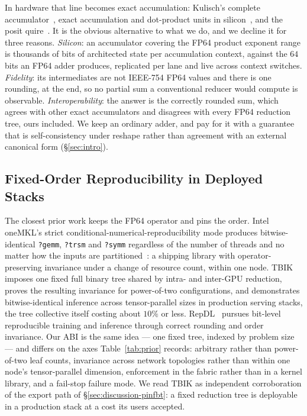 \documentclass[journal,10pt]{IEEEtran}
\theoremstyle{plain}
\theoremstyle{definition}
\theoremstyle{remark}
\newcommand{\sv}[1]{\texttt{#1}}
\begin{document}
In hardware that line becomes exact accumulation: Kulisch's complete
accumulator~\cite{kulisch2013arithmetic}, exact accumulation and dot-product
units in silicon~\cite{dedinechin2008accumulation,koenig2017exactdot}, and
the posit quire~\cite{gustafson2017posit}. It is the obvious alternative to
what we do, and we decline it for three reasons. \emph{Silicon}: an
accumulator covering the FP64 product exponent range is thousands of bits of
architected state per accumulation context, against the $64$ bits an FP64
adder produces, replicated per lane and live across context switches.
\emph{Fidelity}: its intermediates are not IEEE-754 FP64 values and there is
one rounding, at the end, so no partial sum a conventional reducer would
compute is observable. \emph{Interoperability}: the answer is the correctly
rounded sum, which agrees with other exact accumulators and disagrees with
every FP64 reduction tree, ours included. We keep an ordinary adder, and pay
for it with a guarantee that is self-consistency under reshape rather than
agreement with an external canonical form (\S\ref{sec:intro}).

\subsection{Fixed-Order Reproducibility in Deployed Stacks}

The closest prior work keeps the FP64 operator and pins the order. Intel
oneMKL's strict conditional-numerical-reproducibility mode produces
bitwise-identical \sv{?gemm}, \sv{?trsm} and \sv{?symm} regardless of the
number of threads and no matter how the inputs are
partitioned~\cite{onemkl_cnr}: a shipping library with operator-preserving
invariance under a change of resource count, within one node.
TBIK~\cite{tbik2025} imposes one fixed full binary tree shared by intra- and
inter-GPU reduction, proves the resulting invariance for power-of-two
configurations, and demonstrates bitwise-identical inference across
tensor-parallel sizes in production serving stacks, the tree collective
itself costing about $10\%$ or less. RepDL~\cite{repdl2025} pursues
bit-level reproducible training and inference through correct rounding and
order invariance. Our ABI is the same idea --- one fixed tree, indexed by
problem size --- and differs on the axes Table~\ref{tab:prior} records:
arbitrary rather than power-of-two leaf counts, invariance across network
topologies rather than within one node's tensor-parallel dimension,
enforcement in the fabric rather than in a kernel library, and a fail-stop
failure mode. We read TBIK as independent corroboration of the export path
of \S\ref{sec:discussion-pinfbt}: a fixed reduction tree is deployable in a
production stack at a cost its users accepted.
\end{document}

